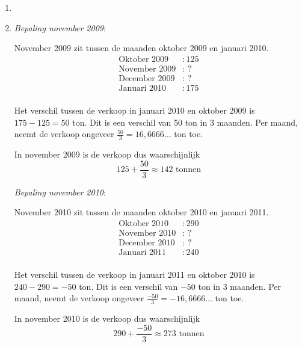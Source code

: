 \begin{antwoord}{4}
\begin{enumerate}
 \item 
 \item 
    \emph{Bepaling november 2009}:

    November 2009 zit tussen de maanden oktober 2009 en januari 2010.
    \begin{align*}
    \text{Oktober 2009} &: 125 \\
    \text{November 2009} &: \text{ ?} \\
    \text{December 2009} &: \text{ ?} \\
    \text{Januari 2010} &: 175 \\
    \end{align*}

    Het verschil tussen de verkoop in januari 2010 en oktober 2009 is $175 - 125 = 50$ ton. Dit is een verschil van 50 ton in 3 maanden. Per maand, neemt de verkoop ongeveer $\frac{50}{3} = 16,6666\ldots$ ton toe.

    In november 2009 is de verkoop dus waarschijnlijk 
    \[
    125 + \frac{50}{3} \approx 142 \text{ tonnen}
    \]

    \bigskip
    \emph{Bepaling november 2010}:

    November 2010 zit tussen de maanden oktober 2010 en januari 2011.
    \begin{align*}
    \text{Oktober 2010} &: 290 \\
    \text{November 2010} &: \text{ ?} \\
    \text{December 2010} &: \text{ ?} \\
    \text{Januari 2011} &: 240 \\
    \end{align*}

    Het verschil tussen de verkoop in januari 2011 en oktober 2010 is $240 - 290 = - 50$ ton. Dit is een verschil van $-50$ ton in 3 maanden. Per maand, neemt de verkoop ongeveer $\frac{-50}{3} = - 16,6666\ldots$ ton toe.

    In november 2010 is de verkoop dus waarschijnlijk 
    \[
    290 + \frac{-50}{3} \approx 273 \text{ tonnen}
    \]
\end{enumerate}
\end{antwoord}


